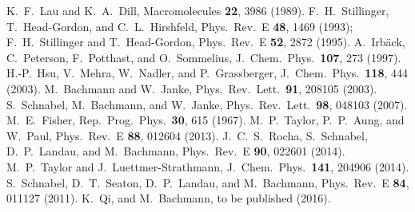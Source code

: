 K.~F.\ Lau and K.~A.\ Dill, Macromolecules \textbf{22}, 3986 (1989).
%
F.~H.\ Stillinger, T.~Head-Gordon, and C.~L.\ Hirshfeld, Phys.\ Rev.~E
\textbf{48}, 1469 (1993);
%
F.~H.\ Stillinger and T.~Head-Gordon, Phys.\ Rev.~E \textbf{52}, 2872
(1995).
%
A.~Irb\"ack, C.~Peterson, F.~Potthast, and O.~Sommelius, J.~Chem.\
Phys.\ \textbf{107}, 273 (1997).
%
H.-P.\ Hsu, V.~Mehra, W.~Nadler, and P.~Grassberger, J.~Chem.\ Phys.\
\textbf{118}, 444 (2003).
% 
M.~Bachmann and W.~Janke, Phys.\ Rev.\ Lett.\ \textbf{91}, 208105 (2003).
% 
\bibitem{ssbj1}
S.~Schnabel, M.~Bachmann, and W.~Janke, Phys.\ Rev.\ Lett.\ \textbf{98},
048103 (2007).
% 
M.~E.\ Fisher, Rep.\ Prog.\ Phys.\ \textbf{30}, 615 (1967).
%
M.~P.\ Taylor, P.~P.\ Aung, and W.~Paul, Phys.\ Rev.\ E \textbf{88}, 012604
(2013).
%
J.~C.~S.\ Rocha, S.~Schnabel, D.~P.\ Landau, and M.~Bachmann, Phys.\ Rev.~E
\textbf{90}, 022601 (2014).
%
M.~P.\ Taylor and J.~Luettmer-Strathmann, J.~Chem.\ Phys.\ \textbf{141},
204906 (2014). 
%
S.~Schnabel, D.~T.\ Seaton, D.~P.\ Landau, and M.~Bachmann, Phys.\ Rev.~E
\textbf{84}, 011127 (2011). 
%
K.~Qi, and M.~Bachmann, to be published (2016).
%

